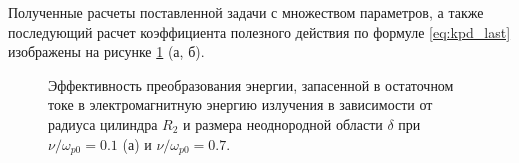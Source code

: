 Полученные расчеты поставленной задачи с множеством параметров, а также последующий расчет коэффициента полезного действия по формуле \eqref{eq:kpd_last} изображены на рисунке \ref{ris:kpd_delta_r2} (а, б).

\begin{figure}[H]	
	\begin{minipage}[H]{0.5\linewidth}
	\end{minipage}	
	\begin{minipage}[H]{0.5\linewidth}
	\end{minipage}
	\caption{Эффективность преобразования энергии, запасенной в остаточном токе в электромагнитную энергию излучения  в зависимости от радиуса цилиндра $R_{2}$ и размера неоднородной области  $\delta$ при  $\nu / \omega_{p 0}=0.1$ (а) и  $\nu / \omega_{p 0}=0.7$.}
	\label{ris:kpd_delta_r2}
\end{figure}
